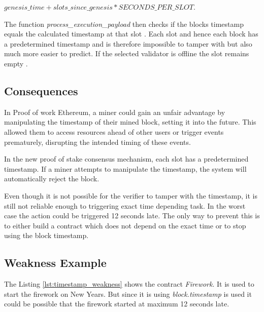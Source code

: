 $genesis\_time + slots\_since\_genesis *
SECONDS\_PER\_SLOT$. 

The function \textit{process\_execution\_payload} then
checks if the blocks timestamp equals the calculated timestamp at that slot
\cite{process-execution-payload}. Each slot and hence each block has
a predetermined timestamp and is therefore impossible to tamper with but
also much more easier to predict. If the selected validator is offline the slot
remains empty \cite{validator-offline}. 

\subsection{Consequences}

In Proof of work Ethereum, a miner could gain an unfair advantage by
manipulating the timestamp of their mined block, setting it into the future.
This allowed them to access resources ahead of other users or trigger events
prematurely, disrupting the intended timing of these events.

In the new proof of stake consensus mechanism, each slot has a predetermined
timestamp. If a miner attempts to manipulate the timestamp, the system will
automatically reject the block.

Even though it is not possible for the verifier to tamper with the timestamp,
it is still not reliable enough to triggering exact time depending task. In the
worst case the action could be triggered 12 seconds late. The only way to
prevent this is to either build a contract which does not depend on the exact
time or to stop using the block timestamp.

\subsection{Weakness Example}



The Listing \ref{lst:timestamp_weakness} shows the contract \textit{Firework}. It
is used to start the firework on New Years. But since it is using
\textit{block.timestamp} is used it could be possible that the firework started
at maximum 12 seconds late.

%
%

    
